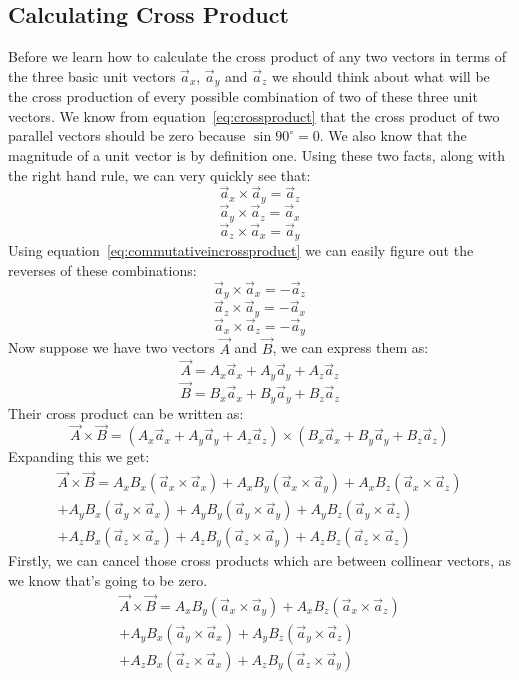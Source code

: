        \subsection{Calculating Cross Product}
            Before we learn how to calculate the cross product of any two vectors in terms of the three basic unit vectors $\vec{a}_x$, $\vec{a}_y$ and $\vec{a}_z$ we should think about what will be the cross production of every possible combination of two of these three unit vectors. We know from equation~\ref{eq:crossproduct} that the cross product of two parallel vectors should be zero because $\sin 90^{\circ} = 0$. We also know that the magnitude of a unit vector is by definition one. Using these two facts, along with the right hand rule, we can very quickly see that:
            $$\vec{a}_x\times\vec{a}_y=\vec{a}_z$$
            $$\vec{a}_y\times\vec{a}_z=\vec{a}_x$$
            $$\vec{a}_z\times\vec{a}_x=\vec{a}_y$$
            Using equation~\ref{eq:commutativeincrossproduct} we can easily figure out the reverses of these combinations:
            $$\vec{a}_y\times\vec{a}_x=-\vec{a}_z$$
            $$\vec{a}_z\times\vec{a}_y=-\vec{a}_x$$
            $$\vec{a}_x\times\vec{a}_z=-\vec{a}_y$$
            Now suppose we have two vectors $\vec{A}$ and $\vec{B}$, we can express them as:
            $$\vec{A} = A_x\vec{a}_x + A_y\vec{a}_y + A_z\vec{a}_z$$
            $$\vec{B} = B_x\vec{a}_x + B_y\vec{a}_y + B_z\vec{a}_z$$
            Their cross product can be written as:
            $$\vec{A}\times\vec{B} = \left(A_x\vec{a}_x + A_y\vec{a}_y + A_z\vec{a}_z\right)\times\left(B_x\vec{a}_x + B_y\vec{a}_y + B_z\vec{a}_z\right)$$
            Expanding this we get:
            \begin{align*}
            \vec{A}\times\vec{B} = A_xB_x(\vec{a}_x\times\vec{a}_x) + A_xB_y(\vec{a}_x\times\vec{a}_y) + A_xB_z(\vec{a}_x\times\vec{a}_z)\\ + A_yB_x(\vec{a}_y\times\vec{a}_x) + A_yB_y(\vec{a}_y\times\vec{a}_y) + A_yB_z(\vec{a}_y\times\vec{a}_z)\\ + A_zB_x(\vec{a}_z\times\vec{a}_x) + A_zB_y(\vec{a}_z\times\vec{a}_y) + A_zB_z(\vec{a}_z\times\vec{a}_z)
            \end{align*}
            Firstly, we can cancel those cross products which are between collinear vectors, as we know that's going to be zero.
            \begin{align*}
            \vec{A}\times\vec{B} = A_xB_y(\vec{a}_x\times\vec{a}_y) + A_xB_z(\vec{a}_x\times\vec{a}_z)\\ + A_yB_x(\vec{a}_y\times\vec{a}_x)  + A_yB_z(\vec{a}_y\times\vec{a}_z)\\ + A_zB_x(\vec{a}_z\times\vec{a}_x) + A_zB_y(\vec{a}_z\times\vec{a}_y) 
            \end{align*}
